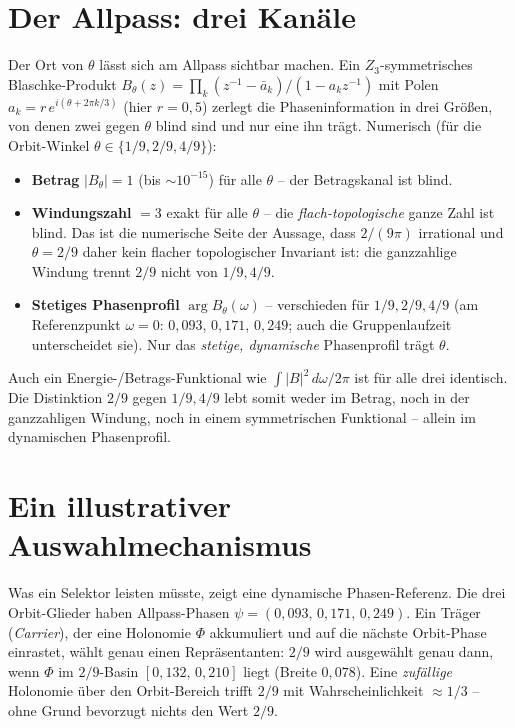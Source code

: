 \section{Der Allpass: drei Kanäle}
Der Ort von $\theta$ lässt sich am Allpass sichtbar machen. Ein $Z_3$-symmetrisches
Blaschke-Produkt $B_\theta(z)=\prod_{k}(z^{-1}-\bar a_k)/(1-a_k z^{-1})$ mit Polen
$a_k=r\,e^{i(\theta+2\pi k/3)}$ (hier $r=0{,}5$) zerlegt die Phaseninformation in drei Größen,
von denen zwei gegen $\theta$ blind sind und nur eine ihn trägt. Numerisch (für die
Orbit-Winkel $\theta\in\{1/9,2/9,4/9\}$):
\begin{itemize}
\item \textbf{Betrag} $|B_\theta|=1$ (bis $\sim10^{-15}$) für alle $\theta$ -- der Betragskanal
  ist blind.
\item \textbf{Windungszahl} $=3$ exakt für alle $\theta$ -- die \emph{flach-topologische}
  ganze Zahl ist blind. Das ist die numerische Seite der Aussage, dass $2/(9\pi)$ irrational
  und $\theta=2/9$ daher kein flacher topologischer Invariant ist: die ganzzahlige Windung
  trennt $2/9$ nicht von $1/9,4/9$.
\item \textbf{Stetiges Phasenprofil} $\arg B_\theta(\omega)$ -- verschieden für
  $1/9,2/9,4/9$ (am Referenzpunkt $\omega=0$: $0{,}093$, $0{,}171$, $0{,}249$; auch die
  Gruppenlaufzeit unterscheidet sie). Nur das \emph{stetige, dynamische} Phasenprofil trägt
  $\theta$.
\end{itemize}
Auch ein Energie-/Betrags-Funktional wie $\int|B|^2\,d\omega/2\pi$ ist für alle drei identisch.
Die Distinktion $2/9$ gegen $1/9,4/9$ lebt somit weder im Betrag, noch in der ganzzahligen
Windung, noch in einem symmetrischen Funktional -- allein im dynamischen Phasenprofil.

\section{Ein illustrativer Auswahlmechanismus}
Was ein Selektor leisten müsste, zeigt eine dynamische Phasen-Referenz. Die drei Orbit-Glieder
haben Allpass-Phasen $\psi=(0{,}093,\,0{,}171,\,0{,}249)$. Ein Träger (\emph{Carrier}), der eine
Holonomie $\Phi$ akkumuliert und auf die nächste Orbit-Phase einrastet, wählt genau einen
Repräsentanten: $2/9$ wird ausgewählt genau dann, wenn $\Phi$ im $2/9$-Basin
$[0{,}132,\,0{,}210]$ liegt (Breite $0{,}078$). Eine \emph{zufällige} Holonomie über den
Orbit-Bereich trifft $2/9$ mit Wahrscheinlichkeit $\approx1/3$ -- ohne Grund bevorzugt nichts
den Wert $2/9$.

